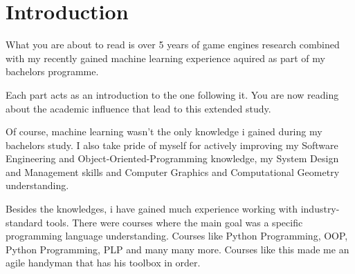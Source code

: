 
  \chapter*{Introduction} 
    What you are about to read is over 5 years of game engines research combined with my recently gained machine learning experience aquired as part of my bachelors programme. 

    Each part acts as an introduction to the one following it. You are now reading about the academic influence that lead to this extended study.

    Of course, machine learning wasn't the only knowledge i gained during my bachelors study. I also take pride of myself for actively improving my Software Engineering and Object-Oriented-Programming knowledge, my System Design and Management skills and Computer Graphics and Computational Geometry understanding. 

    Besides the knowledges, i have gained much experience working with industry-standard tools. There were courses where the main goal was a specific programming language understanding. Courses like Python Programming, OOP, Python Programming, PLP and many many more. Courses like this made me an agile handyman that has his toolbox in order.

